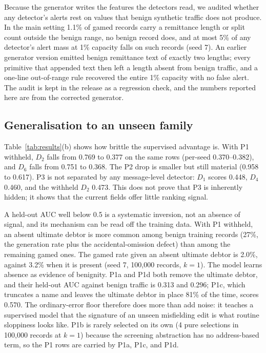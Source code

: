 \documentclass[conference]{IEEEtran}
\begin{document}
Because the generator writes the features the detectors read, we audited
whether any detector's alerts rest on values that benign synthetic traffic
does not produce. In the main setting 1.1\% of gamed records
carry a remittance length or split count outside the benign range, no benign
record does, and at most 5\% of any detector's alert mass
at 1\% capacity falls on such records (seed 7). An earlier generator version
emitted benign remittance text of exactly two lengths; every primitive that
appended text then left a length absent from benign traffic, and a one-line
out-of-range rule recovered the entire 1\% capacity with no false alert. The
audit is kept in the release as a regression check, and the numbers reported
here are from the corrected generator.

\subsection{Generalisation to an unseen family}
Table~\ref{tab:results}(b) shows how brittle the supervised advantage is.
With P1 withheld, $D_2$ falls from 0.769 to 0.377 on the same
rows (per-seed 0.370--0.382), and $D_6$ falls from 0.751 to
0.368. The P2 drop is smaller but still material (0.958 to
0.617). P3 is not separated by any message-level detector: $D_1$
scores 0.448, $D_4$ 0.460, and the withheld $D_2$ 0.473. This
does not prove that P3 is inherently hidden; it shows that the current fields
offer little ranking signal.

A held-out AUC well below 0.5 is a systematic inversion, not an absence of
signal, and its mechanism can be read off the training data. With P1
withheld, an absent ultimate debtor is more common among benign training
records (27\%, the generation rate plus the
accidental-omission defect) than among the remaining gamed ones. The gamed
rate given an absent ultimate debtor is 2.0\%, against
3.2\% when it is present (seed 7, 100{,}000 records,
$k=1$). The model learns absence as evidence of benignity. P1a and P1d both
remove the ultimate debtor, and their held-out AUC against benign traffic is
0.313 and 0.296; P1c, which truncates a name and leaves
the ultimate debtor in place 81\% of the time, scores
0.570. The ordinary-error floor therefore does more than add
noise: it teaches a supervised model that the signature of an unseen
misfielding edit is what routine sloppiness looks like. P1b is rarely
selected on its own (4 pure selections in 100{,}000 records at
$k=1$) because the screening abstraction has no address-based term, so the P1
rows are carried by P1a, P1c, and P1d.
\end{document}

